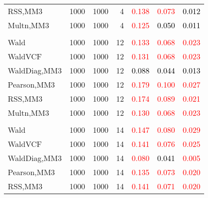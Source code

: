 \documentclass[
]{article}
\begin{document}
\begin{table}[H]
{\begin{tabular}[t]{lrrrrrr}
\hspace{1em}RSS,MM3 & 1000 & 1000 & 4 & \textcolor{red}{0.138} & \textcolor{red}{0.073} & \textcolor{black}{0.012}\\
\hspace{1em}Multn,MM3 & 1000 & 1000 & 4 & \textcolor{red}{0.125} & \textcolor{black}{0.050} & \textcolor{black}{0.011}\\
\addlinespace[0.3em]
\multicolumn{7}{l}{\textbf{1F 15V}}\\
\hspace{1em}Wald & 1000 & 1000 & 12 & \textcolor{red}{0.133} & \textcolor{red}{0.068} & \textcolor{red}{0.023}\\
\hspace{1em}WaldVCF & 1000 & 1000 & 12 & \textcolor{red}{0.131} & \textcolor{red}{0.068} & \textcolor{red}{0.023}\\
\hspace{1em}WaldDiag,MM3 & 1000 & 1000 & 12 & \textcolor{black}{0.088} & \textcolor{black}{0.044} & \textcolor{black}{0.013}\\
\hspace{1em}Pearson,MM3 & 1000 & 1000 & 12 & \textcolor{red}{0.179} & \textcolor{red}{0.100} & \textcolor{red}{0.027}\\
\hspace{1em}RSS,MM3 & 1000 & 1000 & 12 & \textcolor{red}{0.174} & \textcolor{red}{0.089} & \textcolor{red}{0.021}\\
\hspace{1em}Multn,MM3 & 1000 & 1000 & 12 & \textcolor{red}{0.130} & \textcolor{red}{0.068} & \textcolor{red}{0.023}\\
\addlinespace[0.3em]
\multicolumn{7}{l}{\textbf{2F 10V}}\\
\hspace{1em}Wald & 1000 & 1000 & 14 & \textcolor{red}{0.147} & \textcolor{red}{0.080} & \textcolor{red}{0.029}\\
\hspace{1em}WaldVCF & 1000 & 1000 & 14 & \textcolor{red}{0.141} & \textcolor{red}{0.076} & \textcolor{red}{0.025}\\
\hspace{1em}WaldDiag,MM3 & 1000 & 1000 & 14 & \textcolor{red}{0.080} & \textcolor{black}{0.041} & \textcolor{red}{0.005}\\
\hspace{1em}Pearson,MM3 & 1000 & 1000 & 14 & \textcolor{red}{0.135} & \textcolor{red}{0.073} & \textcolor{red}{0.020}\\
\hspace{1em}RSS,MM3 & 1000 & 1000 & 14 & \textcolor{red}{0.141} & \textcolor{red}{0.071} & \textcolor{red}{0.020}\\

\end{tabular}}
\end{table}
\end{document}
